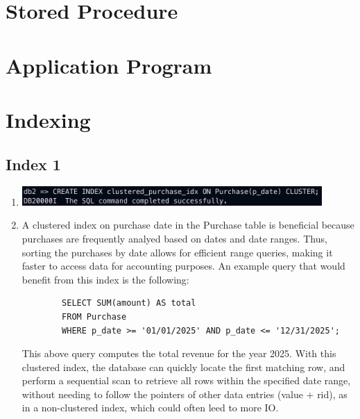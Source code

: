 \documentclass[a4paper,11pt]{article}
\begin{document}
\section*{Stored Procedure}

\section*{Application Program}

\section*{Indexing}

\subsection*{Index 1}

\begin{enumerate}[label=(\alph*)]
    \item \includegraphics[width=0.9\textwidth]{images/idx1.png}
    \item A clustered index on purchase date in the Purchase table is beneficial because purchases are frequently analyed based on dates and date ranges. 
    Thus, sorting the purchases by date allows for efficient range queries, making it faster to access data for accounting purposes.
    An example query that would benefit from this index is the following:
    \begin{lstlisting}
        SELECT SUM(amount) AS total 
        FROM Purchase 
        WHERE p_date >= '01/01/2025' AND p_date <= '12/31/2025';
    \end{lstlisting}
    This above query computes the total revenue for the year 2025. With this clustered index, the database can quickly locate the first matching row, and perform a sequential scan to retrieve all rows within the specified date range, without needing to follow the pointers of other data entries (value + rid), as in a non-clustered index, which could often leed to more IO.
\end{enumerate} 
\end{document}
